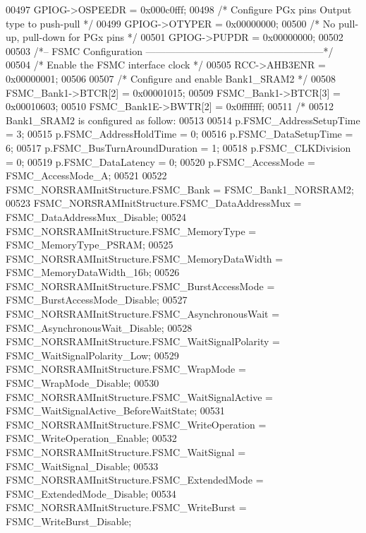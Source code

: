\begin{DoxyCode}
00497   GPIOG->OSPEEDR = 0x000c0fff;
00498   \textcolor{comment}{/* Configure PGx pins Output type to push-pull */}
00499   GPIOG->OTYPER  = 0x00000000;
00500   \textcolor{comment}{/* No pull-up, pull-down for PGx pins */}
00501   GPIOG->PUPDR   = 0x00000000;
00502 
00503 \textcolor{comment}{/*-- FSMC Configuration ------------------------------------------------------*/}
00504   \textcolor{comment}{/* Enable the FSMC interface clock */}
00505   RCC->AHB3ENR         = 0x00000001;
00506 
00507   \textcolor{comment}{/* Configure and enable Bank1\_SRAM2 */}
00508   FSMC\_Bank1->BTCR[2]  = 0x00001015;
00509   FSMC\_Bank1->BTCR[3]  = 0x00010603;
00510   FSMC\_Bank1E->BWTR[2] = 0x0fffffff;
00511 \textcolor{comment}{/*}
00512 \textcolor{comment}{  Bank1\_SRAM2 is configured as follow:}
00513 \textcolor{comment}{}
00514 \textcolor{comment}{  p.FSMC\_AddressSetupTime = 3;}
00515 \textcolor{comment}{  p.FSMC\_AddressHoldTime = 0;}
00516 \textcolor{comment}{  p.FSMC\_DataSetupTime = 6;}
00517 \textcolor{comment}{  p.FSMC\_BusTurnAroundDuration = 1;}
00518 \textcolor{comment}{  p.FSMC\_CLKDivision = 0;}
00519 \textcolor{comment}{  p.FSMC\_DataLatency = 0;}
00520 \textcolor{comment}{  p.FSMC\_AccessMode = FSMC\_AccessMode\_A;}
00521 \textcolor{comment}{}
00522 \textcolor{comment}{  FSMC\_NORSRAMInitStructure.FSMC\_Bank = FSMC\_Bank1\_NORSRAM2;}
00523 \textcolor{comment}{  FSMC\_NORSRAMInitStructure.FSMC\_DataAddressMux = FSMC\_DataAddressMux\_Disable;}
00524 \textcolor{comment}{  FSMC\_NORSRAMInitStructure.FSMC\_MemoryType = FSMC\_MemoryType\_PSRAM;}
00525 \textcolor{comment}{  FSMC\_NORSRAMInitStructure.FSMC\_MemoryDataWidth = FSMC\_MemoryDataWidth\_16b;}
00526 \textcolor{comment}{  FSMC\_NORSRAMInitStructure.FSMC\_BurstAccessMode = FSMC\_BurstAccessMode\_Disable;}
00527 \textcolor{comment}{  FSMC\_NORSRAMInitStructure.FSMC\_AsynchronousWait = FSMC\_AsynchronousWait\_Disable;  }
00528 \textcolor{comment}{  FSMC\_NORSRAMInitStructure.FSMC\_WaitSignalPolarity = FSMC\_WaitSignalPolarity\_Low;}
00529 \textcolor{comment}{  FSMC\_NORSRAMInitStructure.FSMC\_WrapMode = FSMC\_WrapMode\_Disable;}
00530 \textcolor{comment}{  FSMC\_NORSRAMInitStructure.FSMC\_WaitSignalActive = FSMC\_WaitSignalActive\_BeforeWaitState;}
00531 \textcolor{comment}{  FSMC\_NORSRAMInitStructure.FSMC\_WriteOperation = FSMC\_WriteOperation\_Enable;}
00532 \textcolor{comment}{  FSMC\_NORSRAMInitStructure.FSMC\_WaitSignal = FSMC\_WaitSignal\_Disable;}
00533 \textcolor{comment}{  FSMC\_NORSRAMInitStructure.FSMC\_ExtendedMode = FSMC\_ExtendedMode\_Disable;}
00534 \textcolor{comment}{  FSMC\_NORSRAMInitStructure.FSMC\_WriteBurst = FSMC\_WriteBurst\_Disable;}

\end{DoxyCode}
